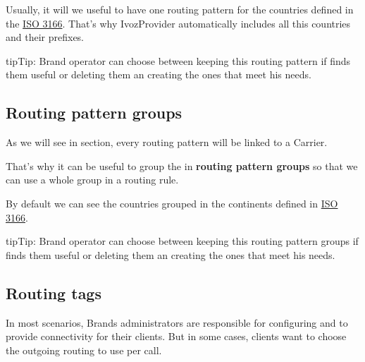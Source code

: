 \documentclass[letterpaper,10pt,english]{sphinxmanual}
\begin{document}
Usually, it will we useful to have one routing pattern for the countries
defined in the \href{https://en.wikipedia.org/wiki/ISO\_3166}{ISO 3166}. That's why IvozProvider automatically
includes all this countries and their prefixes.

\begin{notice}{tip}{Tip:}
Brand operator can choose between keeping this routing pattern if
finds them useful or deleting them an creating the ones that meet his needs.
\end{notice}


\subsection{Routing pattern groups}
\label{administration_portal/brand/routing/routing_patterns_groups::doc}\label{administration_portal/brand/routing/routing_patterns_groups:routing-pattern-groups}
As we will see in {\hyperref[administration_portal/brand/routing/outgoing_routings:outgoing\string-routings]{}} section, every routing
pattern will be linked to a Carrier.

That's why it can be useful to group the {\hyperref[administration_portal/brand/routing/routing_patterns:routing\string-patterns]{}} in \textbf{routing pattern groups}
so that we can use a whole group in a routing rule.

By default we can see the countries grouped in the continents defined in
\href{https://en.wikipedia.org/wiki/ISO\_3166}{ISO 3166}.

\begin{notice}{tip}{Tip:}
Brand operator can choose between keeping this routing pattern groups if
finds them useful or deleting them an creating the ones that meet his needs.
\end{notice}


\subsection{Routing tags}
\label{administration_portal/brand/routing/routing_tags:routing-tags}\label{administration_portal/brand/routing/routing_tags::doc}
In most scenarios, Brands administrators are responsible for configuring
{\hyperref[administration_portal/brand/providers/carriers:carriers]{}} and {\hyperref[administration_portal/brand/routing/outgoing_routings:outgoing\string-routings]{}} to provide connectivity for
their clients. But in some cases, clients want to choose the outgoing routing to
use per call.
\end{document}
